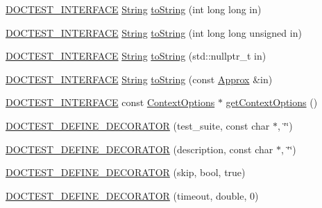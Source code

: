 \begin{DoxyCompactItemize}
\item 
\mbox{\hyperlink{doctest_8h_a9c16ffc635ec47f07797d21ede26b1a5}{D\+O\+C\+T\+E\+S\+T\+\_\+\+I\+N\+T\+E\+R\+F\+A\+CE}} \mbox{\hyperlink{classdoctest_1_1_string}{String}} \mbox{\hyperlink{namespacedoctest_ada057336406349bd947f26b1ddb97bd0}{to\+String}} (int long long in)
\item 
\mbox{\hyperlink{doctest_8h_a9c16ffc635ec47f07797d21ede26b1a5}{D\+O\+C\+T\+E\+S\+T\+\_\+\+I\+N\+T\+E\+R\+F\+A\+CE}} \mbox{\hyperlink{classdoctest_1_1_string}{String}} \mbox{\hyperlink{namespacedoctest_a0996f0f29ee1288fc2363c958fd4fd05}{to\+String}} (int long long unsigned in)
\item 
\mbox{\hyperlink{doctest_8h_a9c16ffc635ec47f07797d21ede26b1a5}{D\+O\+C\+T\+E\+S\+T\+\_\+\+I\+N\+T\+E\+R\+F\+A\+CE}} \mbox{\hyperlink{classdoctest_1_1_string}{String}} \mbox{\hyperlink{namespacedoctest_a88b03675f9b7b8afe5e6d4fa15117181}{to\+String}} (std\+::nullptr\+\_\+t in)
\item 
\mbox{\hyperlink{doctest_8h_a9c16ffc635ec47f07797d21ede26b1a5}{D\+O\+C\+T\+E\+S\+T\+\_\+\+I\+N\+T\+E\+R\+F\+A\+CE}} \mbox{\hyperlink{classdoctest_1_1_string}{String}} \mbox{\hyperlink{namespacedoctest_a63aa06a8555c5aa34a7a6e76e87a3bca}{to\+String}} (const \mbox{\hyperlink{classdoctest_1_1_approx}{Approx}} \&in)
\item 
\mbox{\hyperlink{doctest_8h_a9c16ffc635ec47f07797d21ede26b1a5}{D\+O\+C\+T\+E\+S\+T\+\_\+\+I\+N\+T\+E\+R\+F\+A\+CE}} const \mbox{\hyperlink{structdoctest_1_1_context_options}{Context\+Options}} $\ast$ \mbox{\hyperlink{namespacedoctest_a1ff2f40fd17351e182820848e27e6c79}{get\+Context\+Options}} ()
\item 
\mbox{\hyperlink{namespacedoctest_a104a0e533475e45acbddd9266c4d687e}{D\+O\+C\+T\+E\+S\+T\+\_\+\+D\+E\+F\+I\+N\+E\+\_\+\+D\+E\+C\+O\+R\+A\+T\+OR}} (test\+\_\+suite, const char $\ast$, \char`\"{}\char`\"{})
\item 
\mbox{\hyperlink{namespacedoctest_a07f4a26e2b7cce41abb7d71124951792}{D\+O\+C\+T\+E\+S\+T\+\_\+\+D\+E\+F\+I\+N\+E\+\_\+\+D\+E\+C\+O\+R\+A\+T\+OR}} (description, const char $\ast$, \char`\"{}\char`\"{})
\item 
\mbox{\hyperlink{namespacedoctest_a0ce903d8e37a8fdc185f6e8c73f9b1dd}{D\+O\+C\+T\+E\+S\+T\+\_\+\+D\+E\+F\+I\+N\+E\+\_\+\+D\+E\+C\+O\+R\+A\+T\+OR}} (skip, bool, true)
\item 
\mbox{\hyperlink{namespacedoctest_a09d01a6e97677b7bb508bf925e421963}{D\+O\+C\+T\+E\+S\+T\+\_\+\+D\+E\+F\+I\+N\+E\+\_\+\+D\+E\+C\+O\+R\+A\+T\+OR}} (timeout, double, 0)
\item 

\end{DoxyCompactItemize}
